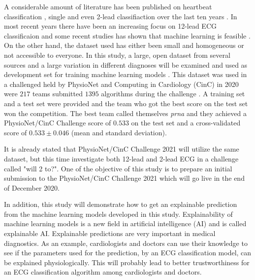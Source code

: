 A considerable amount of literature has been published on heartbeat classification \cite{annam_classification_2020}, single \cite{mathews_novel_2018} and even  2-lead classifiaction \cite{liu_arrhythmia_2013} over the last ten years . In most recent years there have been an increasing focus on 12-lead ECG classificaion and some recent studies has shown that machine learning is feasible \cite{ribeiro_automatic_2020, yao_multi-class_2020,li_automatic_2020, chen_detection_2020}. On the other hand, the  dataset used has either been small and homogeneous \cite{noauthor_classification_nodate} or not accessible to everyone. In this study, a large, open dataset from several sources and a large variation in different diagnoses will be examined and used as development set for training machine learning models \cite{alday_classification_2020}. This dataset was used in a challenged held by PhysioNet \cite{goldberger_physiobank_2000} and Computing in Cardiology (CinC) in 2020 were $217$ teams submitted $1395$ algorithms during the challenge \cite{alday_classification_2020}. A training set and a test set were provided and the team who got the best score on the test set won the competition. The best team called themselves \textit{prna} and they achieved a PhysioNet/CinC Challenge score \cite{alday_classification_2020} of $0.533$ on the test set and a cross-validated score of $0.533\pm 0.046$ (mean and standard deviation). 

It is already stated that PhysioNet/CinC Challenge 2021 will utilize the same dataset, but this time investigate both 12-lead and 2-lead ECG in a challenge called "will 2 to?". One of the objective of this study is to prepare an initial submission to the PhysioNet/CinC Challenge 2021 which will go live in the end of December 2020.

In addition, this study will demonstrate how to get an explainable prediction from the machine learning models developed in this study. Explainability of machine learning models is a new field in artificial intelligence (AI) and is called explainable AI. Explainable predictions are very important in medical diagnostics. As an example, cardiologists and doctors can use their knowledge to see if the parameters used for the prediction, by an ECG classification model, can be explained physiologically. This will probably lead to better trustworthiness for an ECG classification algorithm among cardiologists and doctors.